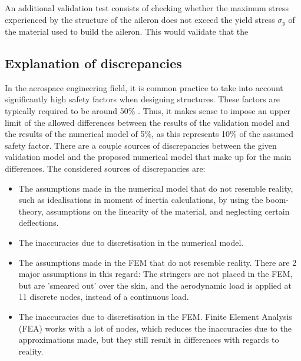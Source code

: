 \noindent An additional validation test consists of checking whether the maximum stress experienced by the structure of the aileron does not exceed the yield stress $\sigma_y$ of the material used to build the aileron. This would validate that the  

\subsection{Explanation of discrepancies}
In the aerospace engineering field, it is common practice to take into account significantly high safety factors when designing structures. These factors are typically required to be around 50\% \cite{safety_factors}. Thus, it makes sense to impose an upper limit of the allowed differences between the results of the validation model and the results of the numerical model of 5\%, as this represents 10\% of the assumed safety factor. There are a couple sources of discrepancies between the given validation model and the proposed numerical model that make up for the main differences. The considered sources of discrepancies are:

\begin{itemize}
    \item The assumptions made in the numerical model that do not resemble reality, such as idealisations in moment of inertia calculations, by using the boom-theory, assumptions on the linearity of the material, and neglecting certain deflections.
    \item The inaccuracies due to discretisation in the numerical model.
    \item The assumptions made in the FEM that do not resemble reality. There are 2 major assumptions in this regard: The stringers are not placed in the FEM, but are 'smeared out' over the skin, and the aerodynamic load is applied at 11 discrete nodes, instead of a continuous load.
    \item The inaccuracies due to discretisation in the FEM. Finite Element Analysis (FEA) works with a lot of nodes, which reduces the inaccuracies due to the approximations made, but they still result in differences with regards to reality.
\end{itemize}




